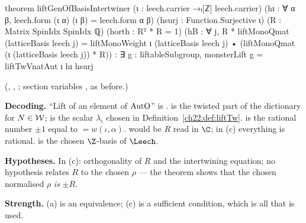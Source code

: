 \begin{leancode}
theorem liftGenOfBasisIntertwiner (ι : leech.carrier →ₗ[ℤ] leech.carrier)
    (hι : ∀ α β, leech.form (ι α) (ι β) = leech.form α β)
    (hsurj : Function.Surjective ι) (R : Matrix SpinIdx SpinIdx ℚ)
    (horth : Rᵀ * R = 1)
    (hB : ∀ j, R * liftMonoQmat (latticeBasis leech j) =
      liftMonoWeight ι (latticeBasis leech j) •
        (liftMonoQmat (ι (latticeBasis leech j)) * R)) :
    ∃ g : liftableSubgroup, monsterLift g = liftTwVnatAut ι hι hsurj
\end{leancode}
(, ,
; section variables ,  as before.)
\begin{dictionary}
\textbf{Decoding.}  ``Lift of an element of $\mathrm{AutO}$'' is .
 is the twisted part of the dictionary for $N\in\mathcal{W}$;  is the scalar $\lambda_\iota$
chosen in Definition~\ref{ch22:def:liftTw}.   is the rational number $\pm1$ equal to
 $=w(\iota,\alpha)$.   would be $R$ read in $\C$; in (c) everything
is rational.   is the chosen $\Z$-basis of $\Leech$.

\textbf{Hypotheses.}  In (c): orthogonality of $R$ and the intertwining equation; no hypothesis relates $R$ to the
chosen $\rho$ --- the theorem shows that the chosen normalised $\rho$ \emph{is} $\pm R$.

\textbf{Strength.}  (a) is an equivalence; (c) is a sufficient condition, which is all that is used.
\end{dictionary}
